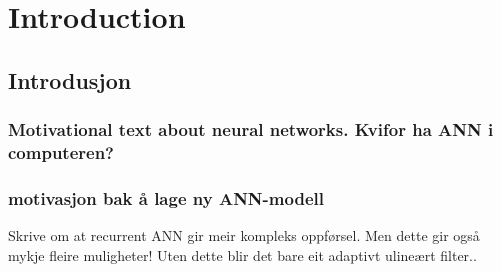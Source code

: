
\chapter{Introduction} %
\section{Introdusjon}
\subsection{Motivational text about neural networks. Kvifor ha ANN i computeren?}

\subsection{motivasjon bak å lage ny ANN-modell}


Skrive om at recurrent ANN gir meir kompleks oppførsel. Men dette gir også mykje fleire muligheter! Uten dette blir det bare eit adaptivt ulineært filter..

